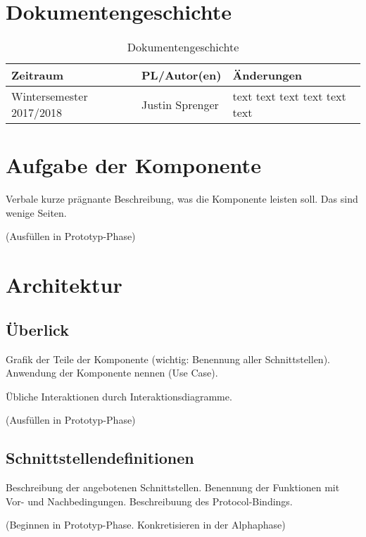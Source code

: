 \section{Dokumentengeschichte}
\begin{table}[h]
 \begin{tabular}{|l|l|p{4cm}|}
 \hline
 Zeitraum & PL/Autor(en) & Änderungen \\
 \hline
 Wintersemester 2017/2018 & Justin Sprenger & 
text \newline 
text \newline 
text \newline 
text \newline 
text \newline 
text \newline 
 
  \\
 \hline
 \end{tabular}
 \caption{Dokumentengeschichte}
 \end{table}

\section{Aufgabe der Komponente}
Verbale kurze prägnante Beschreibung, was die Komponente leisten soll.
Das sind wenige Seiten.

(Ausfüllen in Prototyp-Phase)

\section{Architektur}

\subsection{Überlick}
Grafik der Teile der Komponente (wichtig: Benennung aller Schnittstellen). 
Anwendung der Komponente nennen (Use Case).

Übliche Interaktionen durch Interaktionsdiagramme.

(Ausfüllen in Prototyp-Phase)

\subsection{Schnittstellendefinitionen}
Beschreibung der angebotenen Schnittstellen. Benennung der Funktionen
mit Vor- und Nachbedingungen. Beschreibuung des Protocol-Bindings.

(Beginnen in Prototyp-Phase. Konkretisieren in der Alphaphase)

